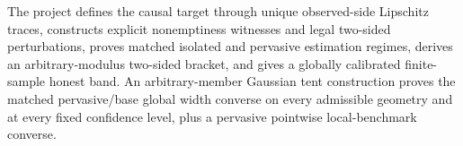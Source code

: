 The project defines the causal target through unique observed-side Lipschitz traces, constructs explicit nonemptiness witnesses and legal two-sided perturbations, proves matched isolated and pervasive estimation regimes, derives an arbitrary-modulus two-sided bracket, and gives a globally calibrated finite-sample honest band. An arbitrary-member Gaussian tent construction proves the matched pervasive/base global width converse on every admissible geometry and at every fixed confidence level, plus a pervasive pointwise local-benchmark converse.